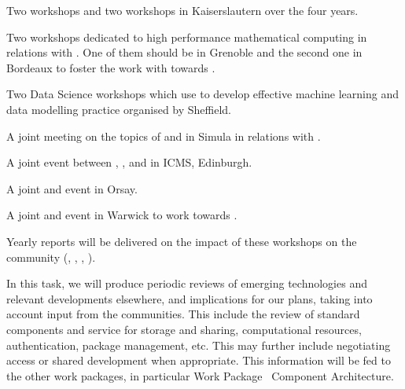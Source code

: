 \begin{workpackage}
\begin{tasklist}
\begin{task}[title=Community building: development workshops, lead=PS,PM=12, partners={UB,UK,UJF,SR,SA,UW}, id=devel-workshops]
\begin{compactitem}
\item Two \Singular workshops and two \GAP workshops in Kaiserslautern
  over the four years.

\item Two workshops dedicated to high performance mathematical
  computing in relations with . One of them should be in
  Grenoble and the second one in Bordeaux to foster the work with
  \Pari towards .

\item Two Data Science workshops which use \TheProject to develop effective machine learning and data modelling practice organised by Sheffield.

\item A joint meeting on the topics of \SMC and \Jupyter in Simula in
  relations with .

\item A joint event between \GAP, \Sage, and \Singular in ICMS,
  Edinburgh.

\item A joint \Jupyter and \Sage event in Orsay.

\item A joint \LMFDB and \Sage event in Warwick to work towards
  .

\end{compactitem}

Yearly reports will be delivered on the impact of these workshops on the community (, , , ).

\end{task}


\begin{task}[title=Reviewing emerging technologies, id=tech-review]
  In this task, we will produce periodic reviews of emerging
  technologies and relevant developments elsewhere, and implications
  for our plans, taking into account input from the communities. This
  include the review of standard components and service for storage
  and sharing, computational resources, authentication, package
  management, etc. This may further include negotiating access or
  shared development when appropriate. This information will be fed to
  the other work packages, in particular Work
  Package~ Component Architecture.
\end{task}


\begin{task}[title=Dissemination: reaching users and diversity, lead=PS,PM=6, partners={UB,USH,SA,UO}, id=dissemination]


\end{task}
\end{tasklist}
\end{workpackage}
